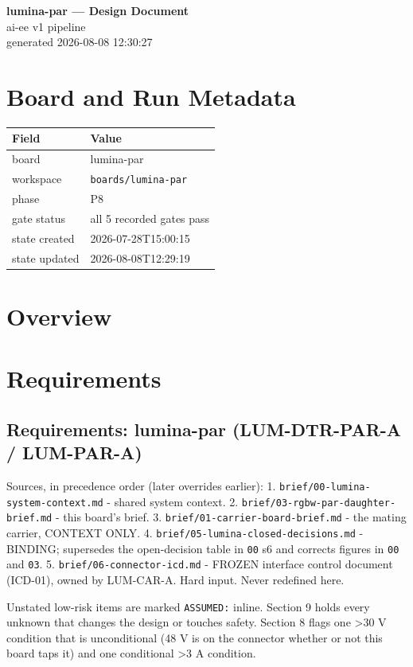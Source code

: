\documentclass[11pt,a4paper]{article}
\begin{document}
\sloppy
\begin{center}
{\LARGE\bfseries lumina-par --- Design Document}\\[6pt]
{\large ai-ee v1 pipeline}\\[2pt]
generated 2026-08-08 12:30:27
\end{center}
\tableofcontents

\section{Board and Run Metadata}
{\small
\begin{longtable}{lp{11cm}}
\toprule
\textbf{Field} & \textbf{Value} \\
\midrule
\endhead
board & lumina-par \\
workspace & \texttt{boards/lumina-par} \\
phase & P8 \\
gate status & all 5 recorded gates pass \\
state created & 2026-07-28T15:00:15 \\
state updated & 2026-08-08T12:29:19 \\
\bottomrule
\end{longtable}
}
\section{Overview}
\section{Requirements}
\subsection*{Requirements: lumina-par (LUM-DTR-PAR-A / LUM-PAR-A)}
Sources, in precedence order (later overrides earlier): 1. \texttt{brief/00-lumina-system-context.md} - shared system context. 2. \texttt{brief/03-rgbw-par-daughter-brief.md} - this board's brief. 3. \texttt{brief/01-carrier-board-brief.md} - the mating carrier, CONTEXT ONLY. 4. \texttt{brief/05-lumina-closed-decisions.md} - BINDING; supersedes the open-decision table in \texttt{00} s6 and corrects figures in \texttt{00} and \texttt{03}. 5. \texttt{brief/06-connector-icd.md} - FROZEN interface control document (ICD-01), owned by LUM-CAR-A. Hard input. Never redefined here.

Unstated low-risk items are marked \texttt{ASSUMED:} inline. Section 9 holds every unknown that changes the design or touches safety. Section 8 flags one \textgreater{}30 V condition that is unconditional (48 V is on the connector whether or not this board taps it) and one conditional \textgreater{}3 A condition.
\end{document}
